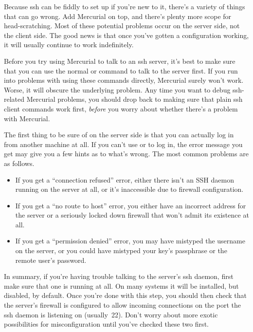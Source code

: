 Because ssh can be fiddly to set up if you're new to it, there's a
variety of things that can go wrong.  Add Mercurial on top, and
there's plenty more scope for head-scratching.  Most of these
potential problems occur on the server side, not the client side.  The
good news is that once you've gotten a configuration working, it will
usually continue to work indefinitely.

Before you try using Mercurial to talk to an ssh server, it's best to
make sure that you can use the normal  or 
command to talk to the server first.  If you run into problems with
using these commands directly, Mercurial surely won't work.  Worse, it
will obscure the underlying problem.  Any time you want to debug
ssh-related Mercurial problems, you should drop back to making sure
that plain ssh client commands work first, \emph{before} you worry
about whether there's a problem with Mercurial.

The first thing to be sure of on the server side is that you can
actually log in from another machine at all.  If you can't use
 or  to log in, the error message you get
may give you a few hints as to what's wrong.  The most common problems
are as follows.
\begin{itemize}
\item If you get a ``connection refused'' error, either there isn't an
  SSH daemon running on the server at all, or it's inaccessible due to
  firewall configuration.
\item If you get a ``no route to host'' error, you either have an
  incorrect address for the server or a seriously locked down firewall
  that won't admit its existence at all.
\item If you get a ``permission denied'' error, you may have mistyped
  the username on the server, or you could have mistyped your key's
  passphrase or the remote user's password.
\end{itemize}
In summary, if you're having trouble talking to the server's ssh
daemon, first make sure that one is running at all.  On many systems
it will be installed, but disabled, by default.  Once you're done with
this step, you should then check that the server's firewall is
configured to allow incoming connections on the port the ssh daemon is
listening on (usually~22).  Don't worry about more exotic
possibilities for misconfiguration until you've checked these two
first.

